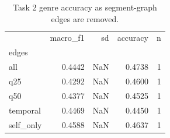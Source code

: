 \begin{table}[t]
\caption{Task 2 genre accuracy as segment-graph edges are removed.}
\label{tab:edges}
\begin{tabular}{lrrrr}
\toprule
 & macro\_f1 & sd & accuracy & n \\
edges &  &  &  &  \\
\midrule
all & 0.4442 & NaN & 0.4738 & 1 \\
q25 & 0.4292 & NaN & 0.4600 & 1 \\
q50 & 0.4377 & NaN & 0.4525 & 1 \\
temporal & 0.4469 & NaN & 0.4450 & 1 \\
self\_only & 0.4588 & NaN & 0.4637 & 1 \\
\bottomrule
\end{tabular}
\end{table}
